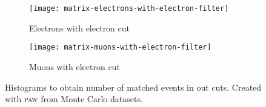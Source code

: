 \begin{figure}[h!]
    \centering
    \begin{subfigure}[c]{0.48\linewidth}
        \centering
        \texttt{[image: matrix-electrons-with-electron-filter]}
        \caption{%
            Electrons with electron cut
        }
        \label{fig:paw-matrix/electrons}
    \end{subfigure}
    \hfill
    \begin{subfigure}[c]{0.48\linewidth}
        \centering
        \texttt{[image: matrix-muons-with-electron-filter]}
        \caption{%
            Muons with electron cut
        }
        \label{fig:paw-matrix/muons}
    \end{subfigure}
    \caption{%
        Histograms to obtain number of matched events in out cuts. Created with
        \textsc{paw} from Monte Carlo datasets.
    }
    \label{fig:paw-matrix-electrons}
\end{figure}
